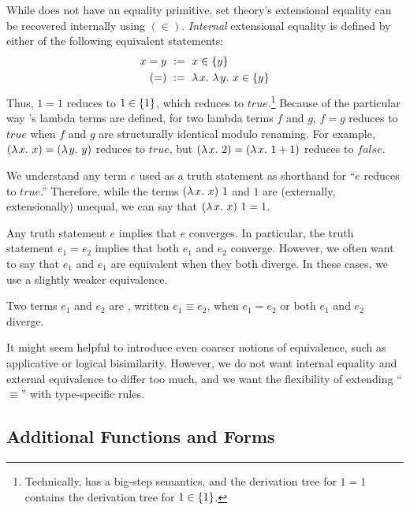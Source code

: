 \documentclass[preprint]{sigplanconf}
\begin{document}
While \lzfclang does not have an equality primitive, set theory's extensional equality can be recovered internally using $(\in)$.
\emph{Internal} extensional equality is defined by either of the following equivalent statements:
\begin{equation}
\begin{aligned}
	x = y &\ := \ x \in \{{y}\} \\
	(=) &\ := \ \lambda\mspace{2mu}{x}\ldotp\,\lambda\mspace{2mu}{y}\ldotp\,{x \in \{{y}\}}
\end{aligned}
\end{equation}
Thus, $1 = 1$ reduces to $1 \in \{{1}\}$, which reduces to $true$.\footnote{Technically, \lzfclang has a big-step semantics, and
the derivation tree for $1 = 1$ contains the derivation tree for $1 \in \{{1}\}$.}
Because of the particular way \lzfclang's lambda terms are defined, for two lambda terms $f$ and $g$, $f = g$ reduces to $true$ when $f$ and $g$ are structurally identical modulo renaming.
For example, $(\lambda\mspace{2mu}{x}\ldotp\,{x}) = (\lambda\mspace{2mu}{y}\ldotp\,{y})$ reduces to $true$, but $(\lambda\mspace{2mu}{x}\ldotp\,{2}) = (\lambda\mspace{2mu}{x}\ldotp\,{1+1})$ reduces to $false$.

We understand any \lzfclang term $\mathit{e}$ used as a truth statement as shorthand for ``$\mathit{e}$ reduces to $true$.''
Therefore, while the terms $(\lambda\mspace{2mu}{x}\ldotp\,{x})~1$ and $1$ are (externally, extensionally) unequal, we can say that $(\lambda\mspace{2mu}{x}\ldotp\,{x})~1 = 1$.

Any truth statement $\mathit{e}$ implies that $\mathit{e}$ converges.
In particular, the truth statement $\mathit{e}_1 = \mathit{e}_2$ implies that both $\mathit{e}_1$ and $\mathit{e}_2$ converge.
However, we often want to say that $\mathit{e}_1$ and $\mathit{e}_1$ are equivalent when they both diverge.
In these cases, we use a slightly weaker equivalence.

\begin{definition}
Two \lzfclang terms $\mathit{e_1}$ and $\mathit{e_2}$ are , written $\mathit{e_1} \equiv \mathit{e_2}$, when $\mathit{e_1} = \mathit{e_2}$ or both $\mathit{e_1}$ and $\mathit{e_2}$ diverge.
\end{definition}

It might seem helpful to introduce even coarser notions of equivalence, such as applicative or logical bisimilarity.
However, we do not want internal equality and external equivalence to differ too much, and we want the flexibility of extending ``$\equiv$'' with type-specific rules.

\subsection{Additional Functions and Forms}
\end{document}
